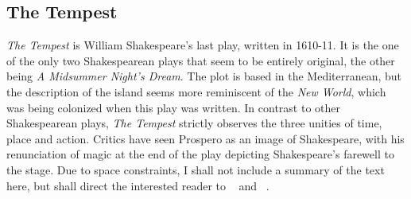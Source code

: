 \documentclass{article}
\begin{document}
\subsection{The Tempest}
\emph{The Tempest} is William Shakespeare's last play, written in 1610-11. It is the one of the only two Shakespearean plays that seem to be entirely original, the other being \emph{A Midsummer Night's Dream}. The plot is based in the Mediterranean, but the description of the island seems more reminiscent of the \emph{New World}, which was being colonized when this play was written. In contrast to other Shakespearean plays, \emph{The Tempest} strictly observes the three unities of time, place and action. Critics have seen Prospero as an image of Shakespeare, with his renunciation of magic at the end of the play depicting Shakespeare's farewell to the stage. Due to space constraints, I shall not include a summary of the text here, but shall direct the interested reader to ~\cite{tempest} and ~\cite{lamb}. 


\end{document}

